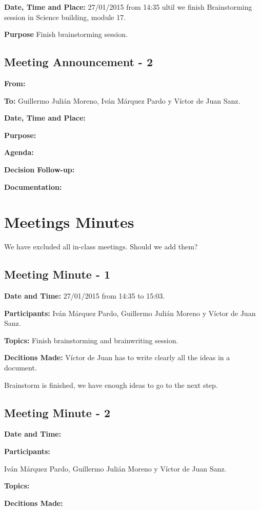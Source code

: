 \documentclass{report}
\begin{document}
\textbf{Date, Time and Place: } 27/01/2015 from 14:35 ultil we finish Brainstorming session in Science building, module 17.

\textbf{Purpose} Finish brainstorming session.

\subsection{Meeting Announcement - 2}


\textbf{From: }

\textbf{To: } Guillermo Julián Moreno, Iván Márquez Pardo y Víctor de Juan Sanz.


\textbf{Date, Time and Place: }


\textbf{Purpose: }


\textbf{Agenda: }

\textbf{Decision Follow-up: }


\textbf{Documentation: }


\section{Meetings Minutes}

We have excluded all in-class meetings. Should we add them?

\subsection{Meeting Minute - 1}


\textbf{Date and Time:} 27/01/2015 from 14:35 to 15:03.


\textbf{Participants: } Iván Márquez Pardo, Guillermo Julián Moreno y Víctor de Juan Sanz.


\textbf{Topics: }
Finish brainstorming and brainwriting session.


\textbf{Decitions Made: }
Víctor de Juan has to write clearly all the ideas in a document.

Brainstorm is finished, we have enough ideas to go to the next step.

\subsection{Meeting Minute - 2}


\textbf{Date and Time:}


\textbf{Participants: }

Iván Márquez Pardo, Guillermo Julián Moreno y Víctor de Juan Sanz.


\textbf{Topics: }


\textbf{Decitions Made: }
\end{document}
